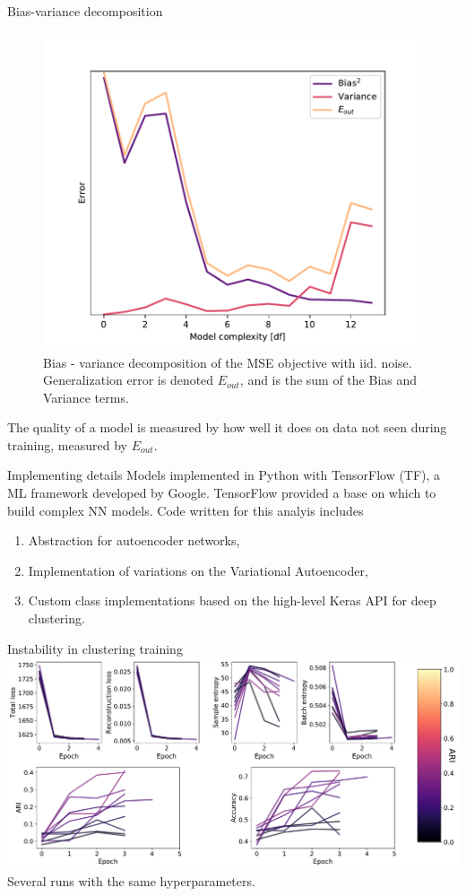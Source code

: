 \documentclass[notes]{beamer}
\begin{document}
\begin{frame}[t]{Bias-variance decomposition}
	\begin{figure}[h]
		\centering
		\includegraphics[width=0.55\linewidth]{../chapters/theory/figures/bias_var_degree.pdf}
		\caption{Bias - variance decomposition of the MSE objective with iid. noise. Generalization error is denoted $E_{out}$, and is the sum of the Bias and Variance terms.}
		\label{fig:bv}
	\end{figure}
	The quality of a model is measured by how well it does on data not seen during training, measured by $E_{out}$.
\end{frame}

\begin{frame}[t]{Implementing details}
	Models implemented in Python with TensorFlow (TF), a ML framework developed by Google.
	TensorFlow provided a base on which to build complex NN models.
	Code written for this analyis includes 

	\begin{enumerate}[I]
		\item Abstraction for autoencoder networks,
		\item Implementation of variations on the Variational Autoencoder,
		\item Custom class implementations based on the high-level Keras API for deep clustering.
	\end{enumerate}
\end{frame}

\begin{frame}[t]{Instability in clustering training}
\centering 
\includegraphics[width=\textwidth]{../chapters/results/clustering/plots/real_mixae.pdf}
Several runs with the same hyperparameters.
\end{frame}

\end{document}
